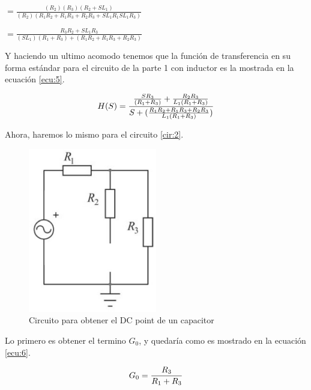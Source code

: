 \documentclass[letterpaper,spanish,12pt]{report}
\begin{document}
\begin{center}$= \frac{(R_{2})(R_{3})(R_{2}+SL_{1})}{(R_{2})(R_{1}R_{2}+R_{1}R_{3}+R_{2}R_{3}+SL_{1}R_{1}SL_{1}R_{3})}$\end{center}

\begin{center}$= \frac{R_{3}R_{2}+SL_{1}R_{3}}{(SL_{1})(R_{1}+R_{3})+(R_{1}R_{2}+R_{1}R_{3}+R_{2}R_{3})}$\end{center}

Y haciendo un ultimo acomodo tenemos que la funci\'on de transferencia en su forma est\'andar para el circuito de la parte 1 con inductor es la mostrada en la ecuaci\'on \ref{ecu:5}.

	\begin{equation}
		\centering
		H(S) = \frac{\frac{SR_{3}}{(R_{1}+R_{3})} + \frac{R_{2}R_{3}}{L_{1}(R_{1}+R_{3})}} {S+(\frac{R_{1}R_{2}+R_{1}R_{3}+R_{2}R_{3}}{L_{1}(R_{1}+R_{3})})}
		\label{ecu:5}
	\end{equation}

Ahora, haremos lo mismo para el circuito \ref{cir:2}.

\begin{figure}[h]
	\centering
		\includegraphics[width=0.50\textwidth]{Circuito3.eps}
	\caption{Circuito para obtener el DC point de un capacitor}
	\label{cir:5}
\end{figure}

Lo primero es obtener el termino $G_{0}$, y quedar\'ia como es mostrado en la ecuaci\'on \ref{ecu:6}.

	\begin{equation}
		\centering
		G_{0} = \frac { R_{3} } { R_{1} + R_{3} }
		\label{ecu:6}
	\end{equation}
\end{document}
